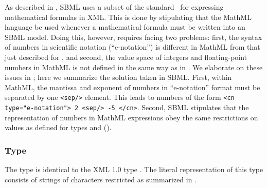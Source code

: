 As described in , SBML uses a subset of
the \mathmltwo standard~\citep{w3c:2000b} for expressing
mathematical formulas in XML.  This is done by stipulating that
the MathML language be used whenever a mathematical formula must
be written into an SBML model.  Doing this, however, requires
facing two problems: first, the syntax of numbers in scientific
notation (``e-notation'') is different in MathML from that just
described for , and second, the value space of
integers and floating-point numbers in MathML is not defined in
the same way as in \xmlschemaone.  We elaborate on these issues in
; here we summarize the solution taken
in SBML.  First, within MathML, the mantissa and exponent of
numbers in ``e-notation'' format must be separated by one
\texttt{<sep/>} element.  This leads to numbers of the form
\texttt{<cn type="e-notation"> 2 <sep/> -5 </cn>}.  Second, SBML
stipulates that the representation of numbers in MathML
expressions obey the same restrictions on values as defined for
types  and 
().


\subsubsection{Type }
\label{sec:id}

The \xmlschemaone type  is identical to the XML 1.0
type .  The literal representation of this type
consists of strings of characters restricted as summarized in
.


